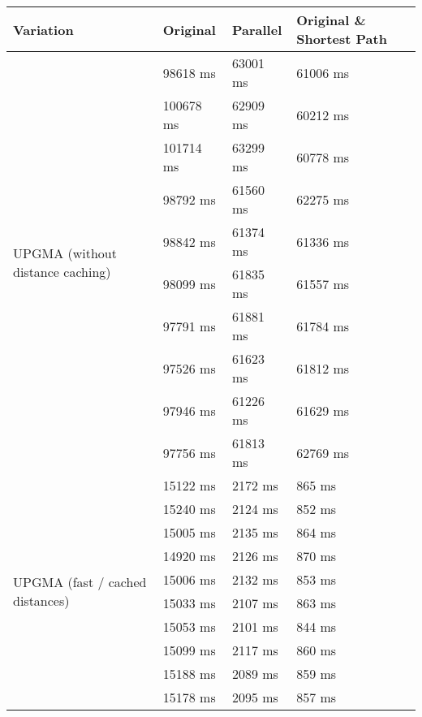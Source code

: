 \begin{table}[!ht]
    \centering
    \begin{tabular}{ | l | l | l | l | } \hline
        \textbf{Variation} & \textbf{Original} & \textbf{Parallel} & \textbf{Original \& Shortest Path} \\
        \hline

        \multirow{10}{*}{\begin{minipage}{3cm}UPGMA (without distance caching)\end{minipage}}
        & 98618 ms & 63001 ms & 61006 ms \\
        & 100678 ms & 62909 ms & 60212 ms \\
        & 101714 ms & 63299 ms & 60778 ms \\
        & 98792 ms & 61560 ms & 62275 ms \\
        & 98842 ms & 61374 ms & 61336 ms \\
        & 98099 ms & 61835 ms & 61557 ms \\
        & 97791 ms & 61881 ms & 61784 ms \\
        & 97526 ms & 61623 ms & 61812 ms \\
        & 97946 ms & 61226 ms & 61629 ms \\
        & 97756 ms & 61813 ms & 62769 ms \\
        \hline

        \multirow{10}{*}{\begin{minipage}{3cm}UPGMA (fast / cached distances)\end{minipage}}
        & 15122 ms & 2172 ms & 865 ms \\
        & 15240 ms & 2124 ms & 852 ms \\
        & 15005 ms & 2135 ms & 864 ms \\
        & 14920 ms & 2126 ms & 870 ms \\
        & 15006 ms & 2132 ms & 853 ms \\
        & 15033 ms & 2107 ms & 863 ms \\
        & 15053 ms & 2101 ms & 844 ms \\
        & 15099 ms & 2117 ms & 860 ms \\
        & 15188 ms & 2089 ms & 859 ms \\
        & 15178 ms & 2095 ms & 857 ms \\
        \hline


\end{tabular}
\end{table}
